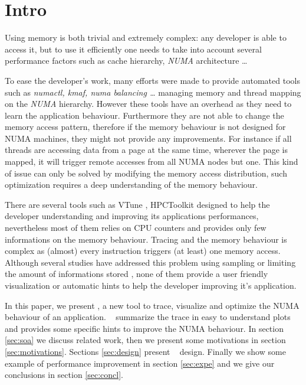 \section{Intro}
\label{sec:intro}

Using memory is both trivial and extremely complex: any developer is able to
access it, but to use it efficiently one needs to take into account several
performance factors such as cache hierarchy, \emph{NUMA} architecture
\cite{Drepper07What} \ldots

To ease the developer's work, many efforts were made to provide automated
tools such as \emph{numactl, kmaf, numa balancing \ldots}
managing memory and thread mapping on the \emph{NUMA} hierarchy. However these
tools have an overhead as they need to learn the application behaviour.
Furthermore they are not able to change the memory access pattern, therefore
if the memory behaviour is not designed for NUMA machines, they might not
provide any improvements. For instance if all threads are accessing data from a
page at the same time, wherever the page is mapped, it will trigger remote
accesses from all NUMA nodes but one. This kind of issue can only be solved by
modifying the memory access distribution, such optimization requires a deep
understanding of the memory behaviour.

There are several tools such as VTune \cite{Reinders05VTune},
HPCToolkit\cite{Adhianto10HPCTOOLKIT}  designed to help the
developer understanding and improving its applications performances,
nevertheless most of them relies on CPU counters and provides only few
informations on the memory behaviour. Tracing and the memory behaviour is
complex as (almost) every instruction triggers (at least) one memory access.
Although several studies have addressed this problem using sampling
\cite{Lachaize12MemProf} or limiting the amount of informations stored
, none of them provide a user friendly visualization or automatic hints
to help the developer improving it's application.


In this paper, we present \TABARNAC, a new tool to trace, visualize and
optimize the NUMA behaviour of an application. \TABARNAC~ summarize the trace
in easy to understand plots and provides some specific hints to improve the
NUMA behaviour. In section \ref{sec:soa} we discuss related work, then we
present some motivations in section \ref{sec:motivations}. Sections
\ref{sec:design} present \TABARNAC~ design. Finally we show some example of
performance improvement in section \ref{sec:expe} and we give our conclusions
in section \ref{sec:concl}.

